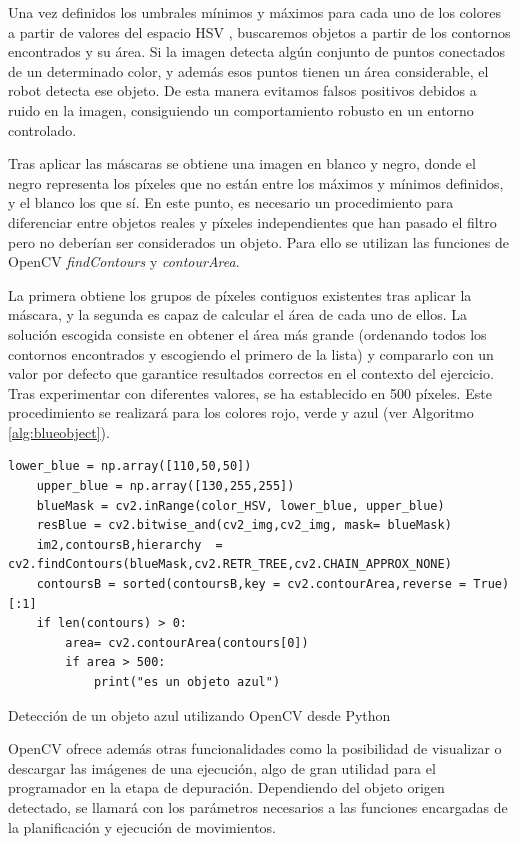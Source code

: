 \documentclass[12pt,spanish,chapterprefix, numbers=noenddot]{book}
\numberwithin{equation}{section}
\numberwithin{figure}{section}
\begin{document}
Una vez definidos los umbrales mínimos y máximos para cada uno de los colores a partir de valores del espacio HSV \cite{colores} \cite{py_colors}, buscaremos objetos a partir de los contornos encontrados y su área. Si la imagen detecta algún conjunto de puntos conectados de un determinado color, y además esos puntos tienen un área considerable, el robot detecta ese objeto. De esta manera evitamos falsos positivos debidos a ruido en la imagen, consiguiendo un comportamiento robusto en un entorno controlado. 

Tras aplicar las máscaras se obtiene una imagen en blanco y negro, donde el negro representa los píxeles que no están entre los máximos y mínimos definidos, y el blanco los que sí. En este punto, es necesario un procedimiento para diferenciar entre objetos reales y píxeles independientes que han pasado el filtro pero no deberían ser considerados un objeto. Para ello se utilizan las funciones de OpenCV \textit{findContours} y \textit{contourArea}. 

La primera obtiene los grupos de píxeles contiguos existentes tras aplicar la máscara, y la segunda es capaz de calcular el área de cada uno de ellos. La solución escogida consiste en obtener el área más grande (ordenando todos los contornos encontrados y escogiendo el primero de la lista) y compararlo con un valor por defecto que garantice resultados correctos en el contexto del ejercicio. Tras experimentar con diferentes valores, se ha establecido en 500 píxeles. Este procedimiento se realizará para los colores rojo, verde y azul (ver Algoritmo \ref{alg:blueobject}).

\begin{algorithm}[htb!]
    \begin{lstlisting}[frame=single] 
    lower_blue = np.array([110,50,50])
    upper_blue = np.array([130,255,255])
    blueMask = cv2.inRange(color_HSV, lower_blue, upper_blue)
    resBlue = cv2.bitwise_and(cv2_img,cv2_img, mask= blueMask)
    im2,contoursB,hierarchy  = cv2.findContours(blueMask,cv2.RETR_TREE,cv2.CHAIN_APPROX_NONE)
    contoursB = sorted(contoursB,key = cv2.contourArea,reverse = True)[:1] 
    if len(contours) > 0:
        area= cv2.contourArea(contours[0])
        if area > 500:
            print("es un objeto azul")
    \end{lstlisting}
\caption{\label{alg:blueobject}Detección de un objeto azul utilizando OpenCV desde Python}
\end{algorithm}

OpenCV ofrece además otras funcionalidades como la posibilidad de visualizar o descargar las imágenes de una ejecución, algo de gran utilidad para el programador en la etapa de depuración. 
Dependiendo del objeto origen detectado, se llamará con los parámetros necesarios a las funciones encargadas de la planificación y ejecución de movimientos.
\end{document}
